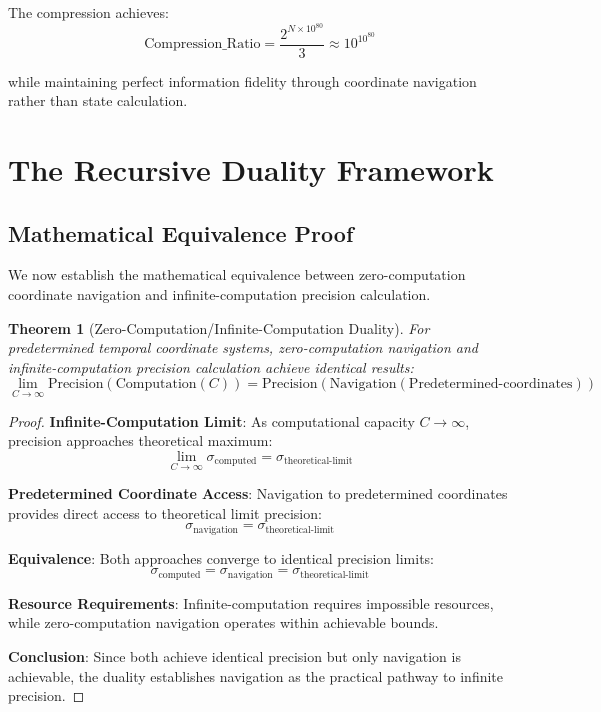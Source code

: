 \documentclass[12pt,a4paper]{article}
\newtheorem{theorem}{Theorem}[section]
\begin{document}
The compression achieves:
$$\text{Compression\_Ratio} = \frac{2^{N \times 10^{80}}}{3} \approx 10^{10^{80}}$$

while maintaining perfect information fidelity through coordinate navigation rather than state calculation.

\section{The Recursive Duality Framework}

\subsection{Mathematical Equivalence Proof}

We now establish the mathematical equivalence between zero-computation coordinate navigation and infinite-computation precision calculation.

\begin{theorem}[Zero-Computation/Infinite-Computation Duality]
For predetermined temporal coordinate systems, zero-computation navigation and infinite-computation precision calculation achieve identical results:
$$\lim_{C \to \infty} \text{Precision}(\text{Computation}(C)) = \text{Precision}(\text{Navigation}(\text{Predetermined-coordinates}))$$
\end{theorem}

\begin{proof}
\textbf{Infinite-Computation Limit}: As computational capacity $C \to \infty$, precision approaches theoretical maximum:
$$\lim_{C \to \infty} \sigma_{\text{computed}} = \sigma_{\text{theoretical-limit}}$$

\textbf{Predetermined Coordinate Access}: Navigation to predetermined coordinates provides direct access to theoretical limit precision:
$$\sigma_{\text{navigation}} = \sigma_{\text{theoretical-limit}}$$

\textbf{Equivalence}: Both approaches converge to identical precision limits:
$$\sigma_{\text{computed}} = \sigma_{\text{navigation}} = \sigma_{\text{theoretical-limit}}$$

\textbf{Resource Requirements}: Infinite-computation requires impossible resources, while zero-computation navigation operates within achievable bounds.

\textbf{Conclusion}: Since both achieve identical precision but only navigation is achievable, the duality establishes navigation as the practical pathway to infinite precision.
\end{proof}
\end{document}
